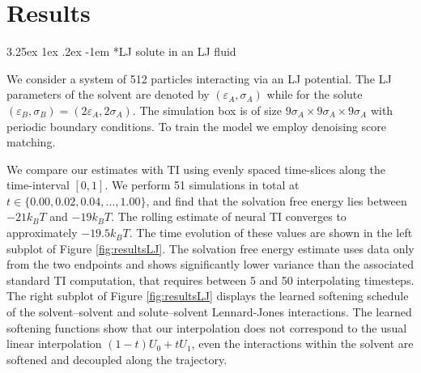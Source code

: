 \documentclass[%
onecolumn,
superscriptaddress,
nofootinbib,
amsmath,amssymb,
table
]{revtex4-2}
\makeatletter
\renewcommand\paragraph{%
  \@startsection{paragraph}{4}{\z@}%
    {3.25ex \@plus1ex \@minus.2ex}%
    {-1em}%
    {\normalfont\normalsize\bfseries}%
}
\makeatother
\begin{document}
\section{Results}
\label{sec:experiments}

\paragraph*{LJ solute in an LJ fluid}
\label{sec:experiments_LJ}

We consider a system of 512 particles interacting via an LJ potential. The LJ parameters of the solvent are denoted by $(\varepsilon_A, \sigma_A)$ while for the solute $(\varepsilon_B,\sigma_B)=(2\varepsilon_A,2\sigma_A)$. The simulation box is of size $9\sigma_A \times9\sigma_A \times 9\sigma_A$ with periodic boundary conditions. To train the model we employ denoising score matching.


We compare our estimates with TI using evenly spaced time-slices along the time-interval $[0,1]$. We perform 51 simulations in total at $t \in \{0.00, 0.02, 0.04, ..., 1.00\}$, and find that the solvation free energy lies between $-21k_BT$ and $-19k_BT$. The rolling estimate of neural TI converges to approximately $-19.5 k_BT$. The time evolution of these values are shown in the left subplot of Figure \ref{fig:resultsLJ}. 
The solvation free energy estimate uses data only from the two endpoints and shows significantly lower variance than the associated standard TI computation, that requires between 5 and 50 interpolating timesteps. The right subplot of Figure \ref{fig:resultsLJ} displays the learned softening schedule of the solvent--solvent and solute--solvent Lennard-Jones interactions. The learned softening functions show that our interpolation does not correspond to the usual linear interpolation $(1-t) U_0 + tU_1$, even the interactions within the solvent are softened and decoupled along the trajectory.
\end{document}
